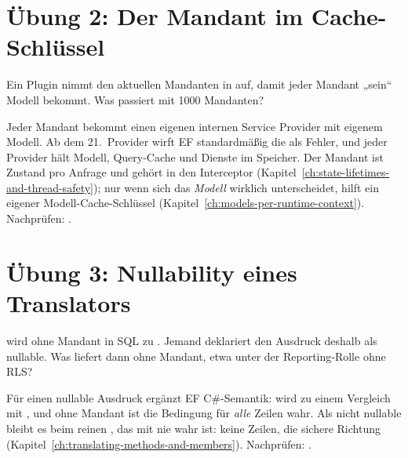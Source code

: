 \section{Übung 2: Der Mandant im Cache-Schlüssel}

Ein Plugin nimmt den aktuellen Mandanten in
 auf, damit
jeder Mandant „sein“ Modell bekommt. Was passiert mit 1000 Mandanten?

\begin{note}[Lösung]
  Jeder Mandant bekommt einen eigenen internen Service Provider mit eigenem Modell. Ab dem
  21.~Provider wirft EF standardmäßig die
  als Fehler, und jeder Provider hält Modell, Query-Cache und Dienste im Speicher. Der Mandant ist
  Zustand pro Anfrage und gehört in den Interceptor
  (Kapitel~\ref{ch:state-lifetimes-and-thread-safety}); nur wenn sich das \emph{Modell} wirklich
  unterscheidet, hilft ein eigener Modell-Cache-Schlüssel (Kapitel~\ref{ch:models-per-runtime-context}).
  Nachprüfen: .
\end{note}

\section{Übung 3: Nullability eines Translators}

 wird ohne Mandant in SQL zu . Jemand
deklariert den Ausdruck deshalb als nullable. Was liefert
dann ohne Mandant, etwa unter der Reporting-Rolle ohne RLS?

\begin{note}[Lösung]
  Für einen nullable Ausdruck ergänzt EF C\#-Semantik: \code{<>} wird zu einem Vergleich mit
  , und ohne Mandant ist die Bedingung
  für \emph{alle} Zeilen wahr. Als nicht nullable bleibt es beim reinen \code{<>}, das mit
   nie wahr ist: keine Zeilen, die sichere Richtung
  (Kapitel~\ref{ch:translating-methods-and-members}).
  Nachprüfen: .
\end{note}

